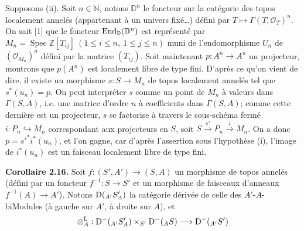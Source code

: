 \documentclass[11pt]{article}
\newcommand{\Spec}{\operatorname{Spec}}
\begin{document}
Supposons (ii). Soit \(n\in\mathbb N\), notons \(\mathbb D^n\) le foncteur sur la catégorie des topos localement annelés (appartenant à un univers fixé\dots) défini par \(T\longmapsto\Gamma(T,\mathcal O_T)^n\). On sait [1] que le foncteur \(\operatorname{End}_{\mathbb D}(\mathbb D^n)\) est représenté par \(M_n=\Spec\mathbb Z[T_{ij}]\ (1\leq i\leq n,\ 1\leq j\leq n)\) muni de l'endomorphisme \(U_n\) de \((\mathcal O_{M_n})^n\) défini par la matrice \((T_{ij})\). Soit maintenant \(p:A^n\longrightarrow A^n\) un projecteur, montrons que \(p(A^n)\) est localement libre de type fini. D'après ce qu'on vient de dire, il existe un morphisme \(s:S\longrightarrow M_n\) de topos localement annelés tel que \(s^*(u_n)=p\). On peut interpréter \(s\) comme un point de \(M_n\) à valeurs dans \(\Gamma(S,A)\), i.e. une matrice d'ordre \(n\) à coefficients dans \(\Gamma(S,A)\); comme cette dernière est un projecteur, \(s\) se factorise à travers le sous-schéma fermé \(i:P_n\hookrightarrow M_n\) correspondant aux projecteurs en \(S\), soit \(S\xrightarrow{s'}P_n\xrightarrow{i}M_n\). On a donc \(p=s'^*i^*(u_n)\), et l'on gagne, car d'après l'assertion sous l'hypothèse (i), l'image de \(i^*(u_n)\) est un faisceau localement libre de type fini.

\textbf{Corollaire 2.16.} Soit \(f:(S',A')\to(S,A)\) un morphisme de topos annelés (défini par un foncteur \(f^{-1}:S\to S'\) et un morphisme de faisceaux d'anneaux \(f^{-1}(A)\to A'\)). Notons \(\mathrm D({}_{A'}S'_A)\) la catégorie dérivée de celle des \(A'\)-\(A\)-biModules (à gauche sur \(A'\), à droite sur \(A\)), et
\[
  \otimes_A^{\mathrm L}:\mathrm D^-(_{A'}S'_A)\times_{S'}\mathrm D^-(_A S)
  \longrightarrow \mathrm D^-(_{A'}S')
\]
\end{document}
